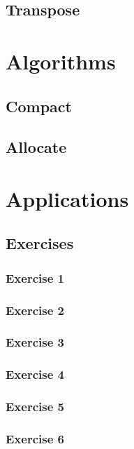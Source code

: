 \documentclass[12px,oz]{report}
\begin{document}
	\section{Transpose}
	\label{sec-transpose}
	
	
\chapter{Algorithms}
\label{ch-algorithms}


	\section{Compact}
	\label{sec-compact}
	
	
	\section{Allocate}
	\label{sec-allocate}
	

\chapter{Applications}
\label{ch-app}

	\section{Exercises}
	
		\subsection{Exercise 1}
		
		\subsection{Exercise 2}
		
		\subsection{Exercise 3}
		
		\subsection{Exercise 4}
		
		
		\subsection{Exercise 5}
		
		\subsection{Exercise 6}
	

\cite{McCool2012}
\cite{udacity:parallel}



\end{document}
